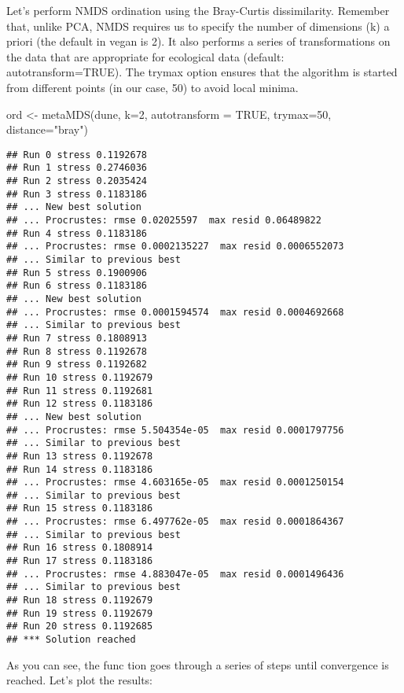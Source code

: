 \documentclass[
]{book}
\newenvironment{Shaded}{\begin{snugshade}}{\end{snugshade}}
\newcommand{\AttributeTok}[1]{\textcolor[rgb]{0.77,0.63,0.00}{#1}}
\newcommand{\ConstantTok}[1]{\textcolor[rgb]{0.00,0.00,0.00}{#1}}
\newcommand{\DecValTok}[1]{\textcolor[rgb]{0.00,0.00,0.81}{#1}}
\newcommand{\FunctionTok}[1]{\textcolor[rgb]{0.00,0.00,0.00}{#1}}
\newcommand{\NormalTok}[1]{#1}
\newcommand{\OtherTok}[1]{\textcolor[rgb]{0.56,0.35,0.01}{#1}}
\newcommand{\StringTok}[1]{\textcolor[rgb]{0.31,0.60,0.02}{#1}}
\begin{document}
Let's perform NMDS ordination using the Bray-Curtis dissimilarity. Remember that, unlike PCA, NMDS requires us to specify the number of dimensions (k) a priori (the default in vegan is 2). It also performs a series of transformations on the data that are appropriate for ecological data (default: autotransform=TRUE). The trymax option ensures that the algorithm is started from different points (in our case, 50) to avoid local minima.

\begin{Shaded}
\begin{Highlighting}[]
\NormalTok{ord }\OtherTok{\textless{}{-}} \FunctionTok{metaMDS}\NormalTok{(dune, }\AttributeTok{k=}\DecValTok{2}\NormalTok{, }\AttributeTok{autotransform =} \ConstantTok{TRUE}\NormalTok{, }\AttributeTok{trymax=}\DecValTok{50}\NormalTok{, }\AttributeTok{distance=}\StringTok{"bray"}\NormalTok{)}
\end{Highlighting}
\end{Shaded}

\begin{verbatim}
## Run 0 stress 0.1192678 
## Run 1 stress 0.2746036 
## Run 2 stress 0.2035424 
## Run 3 stress 0.1183186 
## ... New best solution
## ... Procrustes: rmse 0.02025597  max resid 0.06489822 
## Run 4 stress 0.1183186 
## ... Procrustes: rmse 0.0002135227  max resid 0.0006552073 
## ... Similar to previous best
## Run 5 stress 0.1900906 
## Run 6 stress 0.1183186 
## ... New best solution
## ... Procrustes: rmse 0.0001594574  max resid 0.0004692668 
## ... Similar to previous best
## Run 7 stress 0.1808913 
## Run 8 stress 0.1192678 
## Run 9 stress 0.1192682 
## Run 10 stress 0.1192679 
## Run 11 stress 0.1192681 
## Run 12 stress 0.1183186 
## ... New best solution
## ... Procrustes: rmse 5.504354e-05  max resid 0.0001797756 
## ... Similar to previous best
## Run 13 stress 0.1192678 
## Run 14 stress 0.1183186 
## ... Procrustes: rmse 4.603165e-05  max resid 0.0001250154 
## ... Similar to previous best
## Run 15 stress 0.1183186 
## ... Procrustes: rmse 6.497762e-05  max resid 0.0001864367 
## ... Similar to previous best
## Run 16 stress 0.1808914 
## Run 17 stress 0.1183186 
## ... Procrustes: rmse 4.883047e-05  max resid 0.0001496436 
## ... Similar to previous best
## Run 18 stress 0.1192679 
## Run 19 stress 0.1192679 
## Run 20 stress 0.1192685 
## *** Solution reached
\end{verbatim}

As you can see, the func tion goes through a series of steps until convergence is reached. Let's plot the results:
\end{document}
